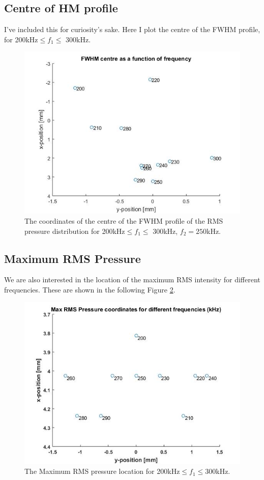 \documentclass[10pt,a4paper]{article}
\begin{document}
\subsection{Centre of HM profile}

I've included this for curiosity's sake. Here I plot the centre of the FWHM profile, for 200kHz$\leq f_1 \leq$ 300kHz.
\begin{figure}[H]\label{FWHM_centre}
\centering
\includegraphics[scale=0.6]{FWHM_centre}
\caption{The coordinates of the centre of the FWHM profile of the RMS pressure distribution for 200kHz$\leq f_1 \leq$ 300kHz, $f_2 = 250$kHz.}
\end{figure}

\subsection{Maximum RMS Pressure}

We are also interested in the location of the maximum RMS intensity for different frequencies. These are shown in the following Figure \ref{RMS_Max}. 

\begin{figure}[H] \label{RMS_Max}
\centering
\includegraphics[scale=0.65]{Max_RMS_pressure_coords}
\caption{The Maximum RMS pressure location for 200kHz$\leq f_1 \leq$300kHz.} 
\end{figure}
\end{document}
